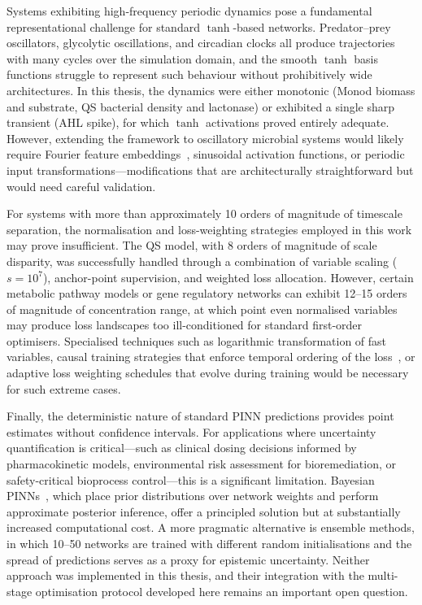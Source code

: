 \documentclass[14pt,a4paper,openany]{extbook}
\begin{document}
Systems exhibiting high-frequency periodic dynamics pose a fundamental representational challenge for standard $\tanh$-based networks. Predator--prey oscillators, glycolytic oscillations, and circadian clocks all produce trajectories with many cycles over the simulation domain, and the smooth $\tanh$ basis functions struggle to represent such behaviour without prohibitively wide architectures. In this thesis, the dynamics were either monotonic (Monod biomass and substrate, QS bacterial density and lactonase) or exhibited a single sharp transient (AHL spike), for which $\tanh$ activations proved entirely adequate. However, extending the framework to oscillatory microbial systems would likely require Fourier feature embeddings~\cite{tancik2020fourier}, sinusoidal activation functions, or periodic input transformations---modifications that are architecturally straightforward but would need careful validation.

For systems with more than approximately 10 orders of magnitude of timescale separation, the normalisation and loss-weighting strategies employed in this work may prove insufficient. The QS model, with 8 orders of magnitude of scale disparity, was successfully handled through a combination of variable scaling ($s = 10^7$), anchor-point supervision, and weighted loss allocation. However, certain metabolic pathway models or gene regulatory networks can exhibit 12--15 orders of magnitude of concentration range, at which point even normalised variables may produce loss landscapes too ill-conditioned for standard first-order optimisers. Specialised techniques such as logarithmic transformation of fast variables, causal training strategies that enforce temporal ordering of the loss~\cite{wang2022mathematical}, or adaptive loss weighting schedules that evolve during training would be necessary for such extreme cases.

Finally, the deterministic nature of standard PINN predictions provides point estimates without confidence intervals. For applications where uncertainty quantification is critical---such as clinical dosing decisions informed by pharmacokinetic models, environmental risk assessment for bioremediation, or safety-critical bioprocess control---this is a significant limitation. Bayesian PINNs~\cite{yang2021bpinn}, which place prior distributions over network weights and perform approximate posterior inference, offer a principled solution but at substantially increased computational cost. A more pragmatic alternative is ensemble methods, in which 10--50 networks are trained with different random initialisations and the spread of predictions serves as a proxy for epistemic uncertainty. Neither approach was implemented in this thesis, and their integration with the multi-stage optimisation protocol developed here remains an important open question.
\end{document}
